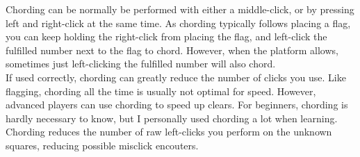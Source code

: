 Chording can be normally be performed with either a middle-click, or by pressing left and right-click at the same time. As chording typically follows placing a flag, you can keep holding the right-click from placing the flag, and left-click the fulfilled number next to the flag to chord. However, when the platform allows, sometimes just left-clicking the fulfilled number will also chord.\\

If used correctly, chording can greatly reduce the number of clicks you use. Like flagging, chording all the time is usually not optimal for speed. However, advanced players can use chording to speed up clears. For beginners, chording is hardly necessary to know, but I personally used chording a lot when learning. Chording reduces the number of raw left-clicks you perform on the unknown squares, reducing possible misclick encouters.\\